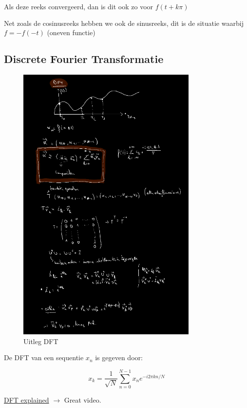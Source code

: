 \documentclass[a4paper]{report}
\begin{document}
Als deze reeks convergeerd, dan is dit ook zo voor $f(t + k\pi)$

Net zoals de cosinusreeks hebben we ook de sinusreeks, dit is de situatie waarbij $f = -f(-t)$ (oneven functie)

\subsection{Discrete Fourier Transformatie}

\begin{figure}[H]
	\centering
	\includegraphics[width=0.8\textwidth]{assets/uitleg_dft.png}
	\caption{Uitleg DFT}
	\label{fig:uitleg_dft}
\end{figure}

De DFT van een sequentie $x_n$ is gegeven door:

$$ x_k = \frac{1}{\sqrt{N}} \sum_{n=0}^{N-1} x_n e^{-i2\pi kn/N} $$

\href{https://www.youtube.com/watch?v=mkGsMWi_j4Q}{DFT explained} $\rightarrow$ Great video.
\end{document}
